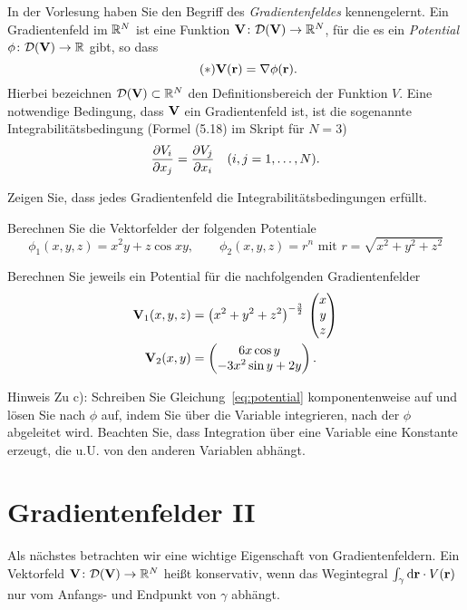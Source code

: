 \documentclass{scrartcl}
\newcommand{\DD}{\mathcal{D}}
\begin{document}
In der Vorlesung haben Sie den Begriff des \emph{Gradientenfeldes} kennengelernt.
Ein Gradientenfeld im $\RR^N$ ist eine Funktion $\mat V\colon \DD(\mat V) \to \RR^N$, für die es ein \emph{Potential} $\phi\colon \DD(\mat V) \to \RR$ gibt, so dass
\[
  \label{eq:potential}
  \tag{$\ast$}
  \mat V(\mat r) = \nabla \phi(\mat r).
\]
Hierbei bezeichnen $\DD(\mat V) \subset \RR^N$ den Definitionsbereich der Funktion $V$.
Eine notwendige Bedingung, dass $\mat V$ ein Gradientenfeld ist, ist die sogenannte Integrabilitätsbedingung (Formel (5.18) im Skript für $N = 3$)
\[
  \pderiv[V_i]{x_j} = \pderiv[V_j]{x_i} \quad (i,j=1,\ldots,N).
\]  
\begin{subex}
  \item{} Zeigen Sie, dass jedes Gradientenfeld die Integrabilitätsbedingungen erfüllt.
  \item{} Berechnen Sie die Vektorfelder der folgenden Potentiale
  \[
    \phi_1(x,y,z) = x^2 y + z \cos xy, \quad\quad \phi_2 (x,y,z) = r^n \mbox{ mit } r = \sqrt{x^2 + y^2 + z^2} 
  \]
  \item{} Berechnen Sie jeweils ein Potential für die nachfolgenden Gradientenfelder
  \begin{align*}
    \mat V_1(x,y,z) &= \left( x^2 + y^2 + z^2 \right)^{-\frac{3}{2}} \, \colvec{x \\ y \\ z} \\
    \mat V_2(x,y) &= \colvec{6x \cos y \\ -3x^2 \sin y + 2y}.
  \end{align*}
\end{subex}
\begin{remark}{Hinweis}
  Zu c): Schreiben Sie Gleichung~\eqref{eq:potential} komponentenweise auf und lösen Sie nach $\phi$ auf, indem Sie über die Variable integrieren, nach der $\phi$ abgeleitet wird.
  Beachten Sie, dass Integration über eine Variable eine Konstante erzeugt, die u.U. von den anderen Variablen abhängt.
\end{remark}

\section{Gradientenfelder II }
\label{sec:gradientenfelder2}

Als nächstes betrachten wir eine wichtige Eigenschaft von Gradientenfeldern.
Ein Vektorfeld $\mat V\colon \DD(\mat V) \to \RR^N$ heißt konservativ, wenn das Wegintegral $\int_\gamma \mat \dd \mat r \cdot V(\mat r) $ nur vom Anfangs- und Endpunkt von $\gamma$ abhängt.
\end{document}
